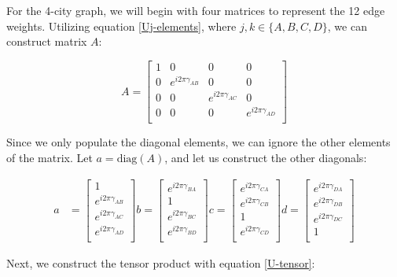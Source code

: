 \documentclass[msc,oneside]{ubcthesis}
\begin{document}
	
	
	For the 4-city graph, we will begin with four matrices to represent the 12 edge weights. Utilizing equation \ref{Uj-elements}, where $j, k \in \{A, B, C, D\}$, we can construct matrix $A$:

	$$
	A = \begin{bmatrix}
		1 & 0 & 0 & 0 \\
		0 & e^{i2\pi\gamma_{AB}} & 0 & 0 \\
		0 & 0 & e^{i2\pi\gamma_{AC}} & 0 \\
		0 & 0 & 0 & e^{i2\pi\gamma_{AD}} \\
	\end{bmatrix}
	$$
	
	Since we only populate the diagonal elements, we can ignore the other elements of the matrix. Let $ a = \mathrm{diag}(A)$, and let us construct the other diagonals:
	
	\begin{align*}	
		a & = \begin{bmatrix}
			1 \\
			e^{i2\pi\gamma_{AB}} \\
			e^{i2\pi\gamma_{AC}} \\
			e^{i2\pi\gamma_{AD}} \\
		\end{bmatrix} 
		b  = \begin{bmatrix}
			e^{i2\pi\gamma_{BA}} \\
			1 \\
			e^{i2\pi\gamma_{BC}} \\
			e^{i2\pi\gamma_{BD}} \\
		\end{bmatrix}
		c  = \begin{bmatrix}
			e^{i2\pi\gamma_{CA}} \\
			e^{i2\pi\gamma_{CB}} \\
			1 \\
			e^{i2\pi\gamma_{CD}} \\
		\end{bmatrix} 
		d = \begin{bmatrix}
			e^{i2\pi\gamma_{DA}} \\
			e^{i2\pi\gamma_{DB}} \\
			e^{i2\pi\gamma_{DC}} \\
			1 \\
		\end{bmatrix} 						 			
	\end{align*}
	
	
	Next, we construct the tensor product with equation \ref{U-tensor}:
	
\end{document}
